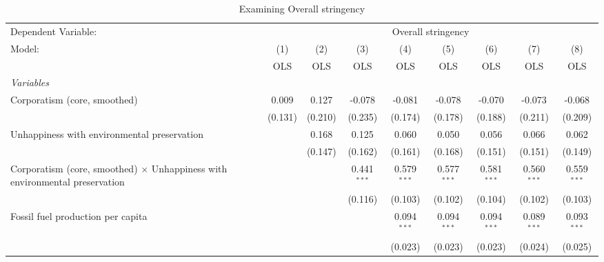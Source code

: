 
\begin{table}[htbp]
   \caption{Examining Overall stringency}
   \centering
   \begin{tabular}{lcccccccc}
      \toprule
      Dependent Variable: & \multicolumn{8}{c}{Overall stringency}\\
      Model:                                                                             & (1)     & (2)     & (3)           & (4)           & (5)           & (6)           & (7)           & (8)\\  
                                                                                         &  OLS    & OLS     & OLS           & OLS           & OLS           & OLS           & OLS           & OLS\\  
      \midrule
      \emph{Variables}\\
      Corporatism (core, smoothed)                                                       & 0.009   & 0.127   & -0.078        & -0.081        & -0.078        & -0.070        & -0.073        & -0.068\\   
                                                                                         & (0.131) & (0.210) & (0.235)       & (0.174)       & (0.178)       & (0.188)       & (0.211)       & (0.209)\\   
      Unhappiness with environmental preservation                                        &         & 0.168   & 0.125         & 0.060         & 0.050         & 0.056         & 0.066         & 0.062\\   
                                                                                         &         & (0.147) & (0.162)       & (0.161)       & (0.168)       & (0.151)       & (0.151)       & (0.149)\\   
      Corporatism (core, smoothed) $\times$ Unhappiness with environmental preservation  &         &         & 0.441$^{***}$ & 0.579$^{***}$ & 0.577$^{***}$ & 0.581$^{***}$ & 0.560$^{***}$ & 0.559$^{***}$\\   
                                                                                         &         &         & (0.116)       & (0.103)       & (0.102)       & (0.104)       & (0.102)       & (0.103)\\   
      Fossil fuel production per capita                                                  &         &         &               & 0.094$^{***}$ & 0.094$^{***}$ & 0.094$^{***}$ & 0.089$^{***}$ & 0.093$^{***}$\\   
                                                                                         &         &         &               & (0.023)       & (0.023)       & (0.023)       & (0.024)       & (0.025)\\   

\end{tabular}
\end{table}
